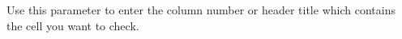 
Use this parameter to enter the column number or header title which contains the cell you want to check.

